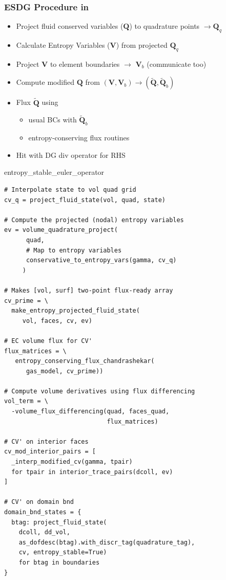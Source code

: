 \begin{frame}[fragile]\frametitle{ESDG Procedure in \mirgecom{}}
\begin{multicols}{2}
\begin{itemize}
\setlength{\itemsep}{3pt}
\item Project fluid conserved variables ($\mathbf{Q}$) to quadrature points $\rightarrow\mathbf{Q}_q$
\item Calculate Entropy Variables ($\mathbf{V}$) from projected $\mathbf{Q}_q$
\item Project $\mathbf{V}$ to element boundaries $\rightarrow$ $\mathbf{V}_b$ (communicate too)
\item Compute modified $\mathbf{Q}$ from $(\mathbf{V},\mathbf{V}_b) \rightarrow (\tilde{\mathbf{Q}},\tilde{\mathbf{Q}}_b)$
\item Flux $\tilde{\mathbf{Q}}$ using
\begin{itemize}
\item usual BCs with $\tilde{\mathbf{Q}}_b$
\item entropy-conserving flux routines
\end{itemize}
\item Hit with DG div operator for RHS
\end{itemize}
\columnbreak
\begin{center}
entropy\_stable\_euler\_operator
\end{center}
\vspace{-10pt}
\begin{lstlisting}
# Interpolate state to vol quad grid
cv_q = project_fluid_state(vol, quad, state)

# Compute the projected (nodal) entropy variables
ev = volume_quadrature_project(
      quad,
      # Map to entropy variables
      conservative_to_entropy_vars(gamma, cv_q)
     )

# Makes [vol, surf] two-point flux-ready array
cv_prime = \
  make_entropy_projected_fluid_state(
     vol, faces, cv, ev)

# EC volume flux for CV'
flux_matrices = \
   entropy_conserving_flux_chandrashekar(
      gas_model, cv_prime))

# Compute volume derivatives using flux differencing
vol_term = \
  -volume_flux_differencing(quad, faces_quad,
                            flux_matrices)

# CV' on interior faces
cv_mod_interior_pairs = [
  _interp_modified_cv(gamma, tpair)
  for tpair in interior_trace_pairs(dcoll, ev)
]

# CV' on domain bnd
domain_bnd_states = {
  btag: project_fluid_state(
    dcoll, dd_vol,
    as_dofdesc(btag).with_discr_tag(quadrature_tag),
    cv, entropy_stable=True)
    for btag in boundaries
}


\end{lstlisting}
\end{multicols}
\end{frame}
